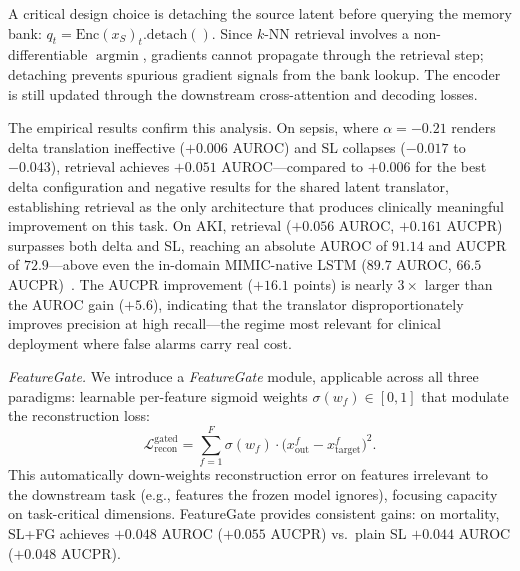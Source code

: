 A critical design choice is detaching the source latent before querying the memory bank: $q_t = \mathrm{Enc}(x_S)_t.\mathrm{detach}()$.
Since $k$-NN retrieval involves a non-differentiable $\operatorname{argmin}$, gradients cannot propagate through the retrieval step; detaching prevents spurious gradient signals from the bank lookup.
The encoder is still updated through the downstream cross-attention and decoding losses.

The empirical results confirm this analysis.
On sepsis, where $\alpha = -0.21$ renders delta translation ineffective ($+0.006$ AUROC) and SL collapses ($-0.017$ to $-0.043$), retrieval achieves $+0.051$ AUROC---compared to $+0.006$ for the best delta configuration and negative results for the shared latent translator, establishing retrieval as the only architecture that produces clinically meaningful improvement on this task.
On AKI, retrieval ($+0.056$ AUROC, $+0.161$ AUCPR) surpasses both delta and SL, reaching an absolute AUROC of $91.14$ and AUCPR of $72.9$---above even the in-domain MIMIC-native LSTM ($89.7$ AUROC, $66.5$ AUCPR)~\cite{vandewater2024yaib}.
The AUCPR improvement ($+16.1$ points) is nearly $3\times$ larger than the AUROC gain ($+5.6$), indicating that the translator disproportionately improves precision at high recall---the regime most relevant for clinical deployment where false alarms carry real cost.

\vspace{0.3em}
\noindent\textit{FeatureGate.}\quad
We introduce a \emph{FeatureGate} module, applicable across all three paradigms: learnable per-feature sigmoid weights $\sigma(w_f) \in [0,1]$ that modulate the reconstruction loss:
\begin{equation}
\label{eq:feature_gate}
\mathcal{L}_{\mathrm{recon}}^{\mathrm{gated}} = \sum_{f=1}^{F} \sigma(w_f) \cdot \bigl(x_{\mathrm{out}}^f - x_{\mathrm{target}}^f\bigr)^2.
\end{equation}
This automatically down-weights reconstruction error on features irrelevant to the downstream task (e.g., features the frozen model ignores), focusing capacity on task-critical dimensions.
FeatureGate provides consistent gains: on mortality, SL+FG achieves $+0.048$ AUROC ($+0.055$ AUCPR) vs.\ plain SL $+0.044$ AUROC ($+0.048$ AUCPR).

